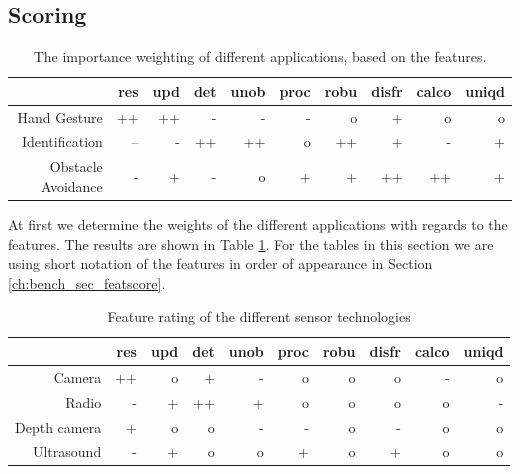 \subsection{Scoring}
\begin{table}[htbp]
  \centering
  \caption{The importance weighting of different applications, based on the features.}
    \begin{tabular}{rrrrrrrrrr}
    \toprule
          & res   & upd   & det   & unob  & proc  & robu  & disfr & calco & uniqd \\
    \midrule
    Hand Gesture & ++    & ++    & -     & -     & -     & o     & +     & o     & o \\
    Identification & --    & -     & ++    & ++    & o     & ++    & +     & -     & + \\
    Obstacle Avoidance & -     & +     & -     & o     & +     & +     & ++    & ++    & + \\
    \bottomrule
    \end{tabular}%
  \label{tab:bench_appweights}%
\end{table}%
At first we determine the weights of the different applications with regards to the features. The results are shown in Table \ref{tab:bench_appweights}. For the tables in this section we are using short notation of the features in order of appearance in Section \ref{ch:bench_sec_featscore}.
\begin{table}[htbp]
  \centering
  \caption{Feature rating of the different sensor technologies}
    \begin{tabular}{rrrrrrrrrr}
    \toprule
          & res   & upd   & det   & unob  & proc  & robu  & disfr & calco & uniqd \\
    \midrule
    Camera & ++    & o     & +     & -     & o     & o     & o     & -     & o \\
    Radio & -     & +     & ++    & +     & o     & o     & o     & o     & - \\
    Depth camera & +     & o     & o     & -     & -     & o     & -     & o     & o \\
    Ultrasound & -     & +     & o     & o     & +     & o     & +     & o     & o \\
    \bottomrule
    \end{tabular}
  \label{tab:bench_feature_rating}
\end{table}

